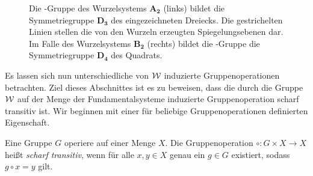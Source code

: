 \begin{figure}
  \centering
  \label{fig:symmetry}
  \hspace{1cm}
  \caption{Die \weyl\hyp{}Gruppe des Wurzelsystems $\mathbf{A_2}$ (links) bildet die Symmetriegruppe $\mathbf{D_3}$ des eingezeichneten Dreiecks. Die gestrichelten Linien stellen die von den Wurzeln erzeugten Spiegelungsebenen dar. Im Falle des Wurzelsystems $\mathbf{B_2}$ (rechts) bildet die \weyl\hyp{}Gruppe die Symmetriegruppe $\mathbf{D_4}$ des Quadrats.}
\end{figure}

Es lassen sich nun unterschiedliche von $\mathcal{W}$ induzierte Gruppenoperationen betrachten. 
Ziel dieses Abschnittes ist es zu beweisen, dass die durch die Gruppe $\mathcal{W}$ auf der Menge der Fundamentalsysteme induzierte Gruppenoperation scharf transitiv ist.
Wir beginnen mit einer für beliebige Gruppenoperationen definierten Eigenschaft.

\begin{defn}
  Eine Gruppe $G$ operiere auf einer Menge $X$.
  Die Gruppenoperation $\circ \colon G \times X \to X$ heißt \emph{scharf transitiv}, wenn für alle $x,y \in X$ genau ein $g \in G$ existiert, sodass $g \circ x = y$ gilt. 
\end{defn}

